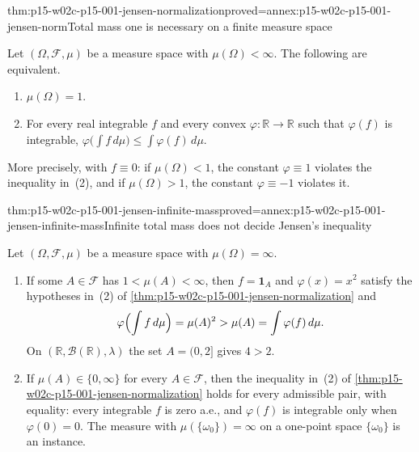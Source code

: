 \begin{hbtheorem}{thm:p15-w02c-p15-001-jensen-normalization}{proved=annex:p15-w02c-p15-001-jensen-norm}{Total mass one is necessary on a finite measure space}
\par\nobreak
Let \((\Omega,\mathcal F,\mu)\) be a measure space with
\(\mu(\Omega)<\infty\). The following are equivalent.
\begin{enumerate}
\item \(\mu(\Omega)=1\).
\item For every real integrable \(f\) and every convex
      \(\varphi:\mathbb R\to\mathbb R\) such that \(\varphi(f)\) is
      integrable,
      \(\varphi\bigl(\int f\,d\mu\bigr)\leq\int\varphi(f)\,d\mu\).
\end{enumerate}
More precisely, with \(f\equiv0\): if \(\mu(\Omega)<1\), the constant
\(\varphi\equiv1\) violates the inequality in~(2), and if
\(\mu(\Omega)>1\), the constant \(\varphi\equiv-1\) violates it.
\end{hbtheorem}

\begin{hbtheorem}{thm:p15-w02c-p15-001-jensen-infinite-mass}{proved=annex:p15-w02c-p15-001-jensen-infinite-mass}{Infinite total mass does not decide Jensen's inequality}
\par\nobreak
Let \((\Omega,\mathcal F,\mu)\) be a measure space with
\(\mu(\Omega)=\infty\).
\begin{enumerate}
\item If some \(A\in\mathcal F\) has \(1<\mu(A)<\infty\), then
      \(f=\mathbf1_A\) and \(\varphi(x)=x^2\) satisfy the hypotheses
      in~(2) of \cref{thm:p15-w02c-p15-001-jensen-normalization} and
      \[
       \varphi\Bigl(\int f\,d\mu\Bigr)=\mu(A)^2>\mu(A)=\int\varphi(f)\,d\mu .
      \]
      On \((\mathbb R,\mathcal B(\mathbb R),\lambda)\) the set
      \(A=(0,2]\) gives \(4>2\).
\item If \(\mu(A)\in\{0,\infty\}\) for every \(A\in\mathcal F\), then
      the inequality in~(2) of
      \cref{thm:p15-w02c-p15-001-jensen-normalization} holds for every
      admissible pair, with equality: every integrable \(f\) is zero
      a.e., and \(\varphi(f)\) is integrable only when
      \(\varphi(0)=0\). The measure with \(\mu(\{\omega_0\})=\infty\) on
      a one-point space \(\{\omega_0\}\) is an instance.
\end{enumerate}
\end{hbtheorem}

